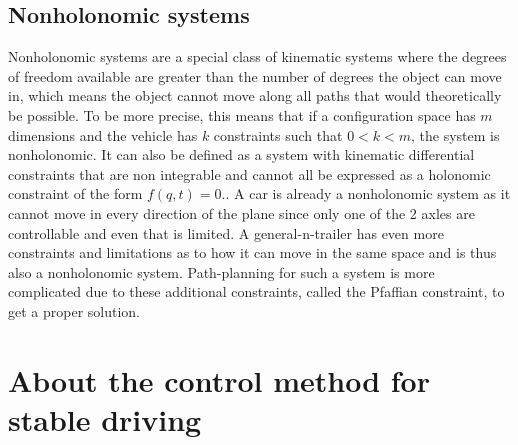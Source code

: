 
\subsection{Nonholonomic systems}
\label{sec:nonholonomic_systems}

Nonholonomic systems are a special class of kinematic systems where the degrees of freedom available are greater than the number of degrees the object can move in, which means the object cannot move along all paths that would theoretically be possible. To be more precise, this means that if a configuration space has $m$ dimensions and the vehicle has $k$ constraints such that $0<k<m$, the system is nonholonomic. It can also be defined as a system with kinematic differential constraints that are non integrable and cannot all be expressed as a holonomic constraint of the form $f(q,t)=0$.\cite{29,30}. A car is already a nonholonomic system as it cannot move in every direction of the plane since only one of the 2 axles are controllable and even that is limited. A general-n-trailer has even more constraints and limitations as to how it can move in the same space and is thus also a nonholonomic system. Path-planning for such a system is more complicated due to these additional constraints, called the Pfaffian constraint, to get a proper solution. 

\section{About the control method for stable driving}
\label{sec:about_control_method}

